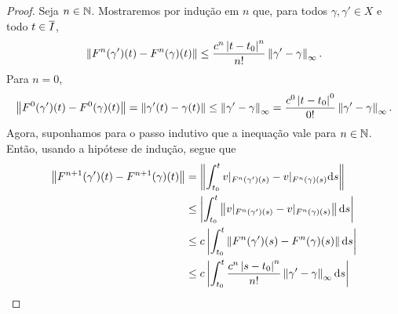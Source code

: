 \begin{proof}
Seja $n \in \mathbb{N}$. Mostraremos por indução em $n$ que, para todos $\gamma, \gamma' \in X$ e todo $t \in \overline{I}$,
	\begin{equation*}
	\left\Vert{F^n(\gamma')(t) - F^n(\gamma)(t)}\right\Vert \leq \frac{c^n\left\vert{t-t_0}\right\vert^n}{n!} \left\Vert{\gamma' - \gamma}\right\Vert_{\infty}.
	\end{equation*}
Para $n=0$,%
	\begin{align*}
	\left\Vert{F^0(\gamma')(t) - F^0(\gamma)(t)}\right\Vert = \left\Vert{\gamma'(t) - \gamma(t)}\right\Vert \leq \left\Vert{\gamma' - \gamma}\right\Vert_{\infty} = \frac{c^0\left\vert{t-t_0}\right\vert^0}{0!} \left\Vert{\gamma' - \gamma}\right\Vert_{\infty}.
	\end{align*}
Agora, suponhamos para o passo indutivo que a inequação vale para $n \in \mathbb{N}$. Então,%
usando a hipótese de indução, segue que
	\begin{align*}
	\nor{F^{n+1}(\gamma')(t) - F^{n+1}(\gamma)(t)} %
		&=\nor{\int_{t_0}^{t} v|_{F^n(\gamma')(s)} - v|_{F^n(\gamma)(s)} \dd s} \\
		&\leq \abs{\int_{t_0}^{t} \nor{v|_{F^n(\gamma')(s)} - v|_{F^n(\gamma)(s)}} \dd s} \\
		&\leq c \abs{\int_{t_0}^{t} \nor{F^n(\gamma')(s) - F^n(\gamma)(s)} \dd s} \\
		&\leq c \abs{\int_{t_0}^{t} \frac{c^n\abs{s-t_0}^n}{n!} \norsup{\gamma' - \gamma} \dd s } \\

\end{align*}
\end{proof}
